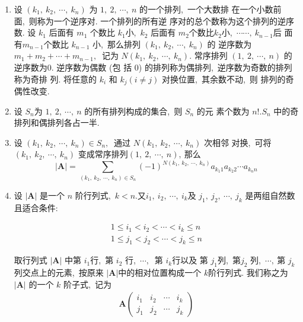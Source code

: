 \begin{enumerate}
		\item 设 $ \left(k_{1},\  k_{2},\  \cdots,\  k_{n}\right) $ 为 $ 1,\ 2,\  \cdots,\  n$  的一个排列,\ 一个大数排 在一个小数前面,\  则称为一个逆序对. 一个排列的所有逆 序对的总个数称为这个排列的逆序数. 设 $ k_{1} $ 后面有  $m_{1} $ 个数比  $k_{1}  $小,\ $  k_{2}$  后面有  $m_{2}  $个数比$  k_{2}  $小,\   $\cdots \cdots,\  k_{n-1}  $后 面有$  m_{n-1}  $个数比 $ k_{n-1}$  小,\  那么排列  $\left(k_{1},\  k_{2},\  \cdots,\  k_{n}\right) $ 的 逆序数为  $m_{1}+m_{2}+\cdots+m_{n-1} ,\ $ 记为 $ N\left(k_{1},\  k_{2},\  \cdots,\  k_{n}\right) .$ 常序排列  $(1,\ 2,\  \cdots,\  n) $ 的逆序数为$ 0 .$ 逆序数为偶数 (包 括 0) 的排列称为偶排列,\  逆序数为奇数的排列称为奇排 列. 将任意的  $k_{i}$  和  $k_{j}(i \neq j) $ 对换位置,\  其余数不动,\  则 排列的奇偶性改变.
		
		\item 设 $ S_{n}  $为 $ 1,\ 2,\  \cdots,\  n$  的所有排列构成的集合,\  则 $ S_{n}$  的元 素个数为 $ n ! . S_{n} $ 中的奇排列和偶排列各占一半.
		
		\item 设 $ \left(k_{1},\  k_{2},\  \cdots,\  k_{n}\right) \in S_{n} ,\ $ 通过  $N\left(k_{1},\  k_{2},\  \cdots,\  k_{n}\right)$  次相邻 对换,\ 可将  $\left(k_{1},\  k_{2},\  \cdots,\  k_{n}\right) $ 变成常序排列$  (1,\ 2,\  \cdots,\  n) ,\  $那么
		$$|\boldsymbol{A}|=\sum_{\left(k_{1},\  k_{2},\  \cdots,\  k_{n}\right) \in S_{n}}(-1)^{N\left(k_{1},\  k_{2},\  \cdots,\  k_{n}\right)} a_{k_{1} 1} a_{k_{2} 2} \cdots a_{k_{n} n}$$
		
		\item 设 $ |\boldsymbol{A}| $ 是一个 $ n $ 阶行列式,\ $  k<n . $又$  i_{1},\  i_{2},\  \cdots,\  i_{k}  $及 $ j_{1},\  j_{2},\  \cdots,\  j_{k} $ 是两组自然数且适合条件:
		
		$$	\begin{array}{l}
			1 \leqslant i_{1}<i_{2}<\cdots<i_{k} \leqslant n \\
			1 \leqslant j_{1}<j_{2}<\cdots<j_{k} \leqslant n
		\end{array}$$
		
		取行列式 $|\boldsymbol{A}| $ 中第 $ i_{1}  $行,\  第  $i_{2}$  行,\   $\cdots ,\ $ 第  $i_{k}  $行以及 第  $j_{1}  $列,\ 第$  j_{2} $ 列,\  $ \cdots ,\  $第  $j_{k} $ 列交点上的元素,\  按原来 $ |\boldsymbol{A}|  $中的相对位置构成一个 $ k  $阶行列式. 我们称之为 $ |\boldsymbol{A}| $ 的一个 $ k $ 阶子式,\  记为
		\begin{align}
			\boldsymbol{A}\left(\begin{array}{cccc}
				i_{1} & i_{2} & \cdots & i_{k} \\
				j_{1} & j_{2} & \cdots & j_{k}
			\end{array}\right)\label{eq2.1.1}
		\end{align}
		

\end{enumerate}
